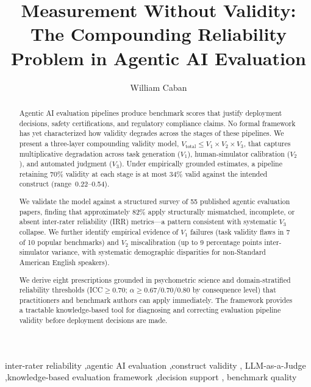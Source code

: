\documentclass[preprint,12pt]{elsarticle}
\begin{document}
\begin{frontmatter}

\title{Measurement Without Validity: The Compounding Reliability Problem in Agentic AI Evaluation}


\author[addr1]{William Caban}


\address[addr1]{Red Hat, Inc., Raleigh, North Carolina, USA;
  Alma Mater Europaea University, Vienna, Austria}

\begin{abstract}
Agentic AI evaluation pipelines produce benchmark scores that justify deployment
decisions, safety certifications, and regulatory compliance claims. No formal
framework has yet characterized how validity degrades across the stages of these
pipelines. We present a three-layer compounding validity model,
$V_{\text{total}} \leq V_1 \times V_2 \times V_3$, that captures multiplicative
degradation across task generation ($V_1$), human-simulator calibration ($V_2$),
and automated judgment ($V_3$). Under empirically grounded estimates, a pipeline
retaining 70\% validity at each stage is at most 34\% valid against the intended
construct (range~0.22--0.54).

We validate the model against a structured survey of 55 published agentic
evaluation papers, finding that approximately 82\% apply structurally mismatched,
incomplete, or absent inter-rater reliability (IRR) metrics---a pattern consistent
with systematic $V_3$ collapse. We further identify empirical evidence of $V_1$
failures (task validity flaws in 7 of 10 popular benchmarks) and $V_2$
miscalibration (up to 9 percentage points inter-simulator variance, with systematic
demographic disparities for non-Standard American English speakers).

We derive eight prescriptions grounded in psychometric science and domain-stratified
reliability thresholds (ICC$\geq$0.70; $\alpha \geq 0.67$/$0.70$/$0.80$ by
consequence level) that practitioners and benchmark authors can apply immediately.
The framework provides a tractable knowledge-based tool for diagnosing and
correcting evaluation pipeline validity before deployment decisions are made.
\end{abstract}

\begin{keyword}
inter-rater reliability \sep agentic AI evaluation \sep construct validity \sep
LLM-as-a-Judge \sep knowledge-based evaluation framework \sep decision support \sep
benchmark quality
\end{keyword}

\end{frontmatter}
\end{document}
